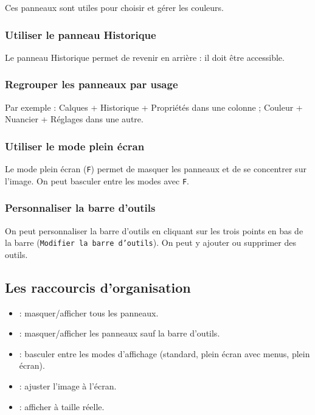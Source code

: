 Ces panneaux sont utiles pour choisir et gérer les couleurs.

\subsubsection{Utiliser le panneau Historique}

Le panneau Historique permet de revenir en arrière : il doit être accessible.

\subsubsection{Regrouper les panneaux par usage}

Par exemple : Calques + Historique + Propriétés dans une colonne ; Couleur + Nuancier + Réglages dans une autre.

\subsubsection{Utiliser le mode plein écran}

Le mode plein écran (\texttt{F}) permet de masquer les panneaux et de se concentrer sur l'image. On peut basculer entre les modes avec \texttt{F}.

\subsubsection{Personnaliser la barre d'outils}

On peut personnaliser la barre d'outils en cliquant sur les trois points en bas de la barre (\texttt{Modifier la barre d'outils}). On peut y ajouter ou supprimer des outils.

\subsection{Les raccourcis d'organisation}

\begin{itemize}
    \item {} : masquer/afficher tous les panneaux.
    \item {} : masquer/afficher les panneaux sauf la barre d'outils.
    \item {} : basculer entre les modes d'affichage (standard, plein écran avec menus, plein écran).
    \item {} : ajuster l'image à l'écran.
    \item {} : afficher à taille réelle.
\end{itemize}

